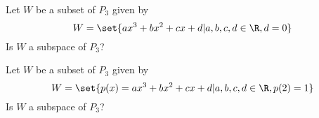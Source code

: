 \begin{enumialphparenastyle}
\begin{ex} Let $W$ be a subset of $P_3$ given by 
\[
W = \set{
ax^3 + bx^2 + cx + d | a,b,c,d \in \R, d = 0 }
\]
Is $W$ a subspace of $P_3$?
\end{ex}

\begin{ex} Let $W$ be a subset of $P_3$ given by 
\[
W = \set{
p(x) = ax^3 + bx^2 + cx + d | a,b,c,d \in \R, p(2) = 1 }
\]
Is $W$ a subspace of $P_3$?
\end{ex}

\end{enumialphparenastyle}
